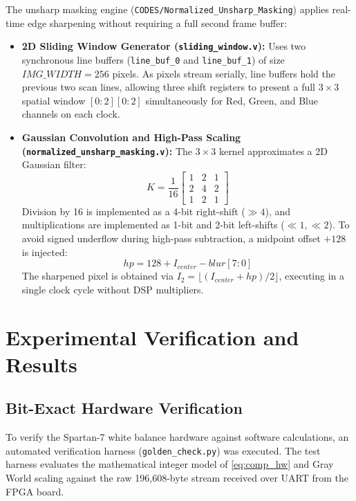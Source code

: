 \documentclass[10pt,twocolumn,letterpaper]{article}
\begin{document}
The unsharp masking engine (\texttt{CODES/Normalized\_Unsharp\_Masking}) applies real-time edge sharpening without requiring a full second frame buffer:
\begin{itemize}
    \item \textbf{2D Sliding Window Generator (\texttt{sliding\_window.v}):} Uses two synchronous line buffers (\texttt{line\_buf\_0} and \texttt{line\_buf\_1}) of size $IMG\_WIDTH = 256$ pixels. As pixels stream serially, line buffers hold the previous two scan lines, allowing three shift registers to present a full $3\times3$ spatial window $[0:2][0:2]$ simultaneously for Red, Green, and Blue channels on each clock.
    \item \textbf{Gaussian Convolution and High-Pass Scaling (\texttt{normalized\_unsharp\_masking.v}):} The $3\times3$ kernel approximates a 2D Gaussian filter:
    \begin{equation}
      K = \frac{1}{16} \begin{bmatrix} 1 & 2 & 1 \\ 2 & 4 & 2 \\ 1 & 2 & 1 \end{bmatrix}
    \end{equation}
    Division by 16 is implemented as a 4-bit right-shift ($\gg 4$), and multiplications are implemented as 1-bit and 2-bit left-shifts ($\ll 1, \ll 2$).
    To avoid signed underflow during high-pass subtraction, a midpoint offset $+128$ is injected:
    \begin{equation}
      hp = 128 + I_{center} - blur[7:0]
    \end{equation}
    The sharpened pixel is obtained via $I_2 = \lfloor(I_{center} + hp) / 2\rfloor$, executing in a single clock cycle without DSP multipliers.
\end{itemize}

\section{Experimental Verification and Results}
\label{sec:results}

\subsection{Bit-Exact Hardware Verification}

To verify the Spartan-7 white balance hardware against software calculations, an automated verification harness (\texttt{golden\_check.py}) was executed. The test harness evaluates the mathematical integer model of \cref{eq:comp_hw} and Gray World scaling against the raw 196,608-byte stream received over UART from the FPGA board.
\end{document}
